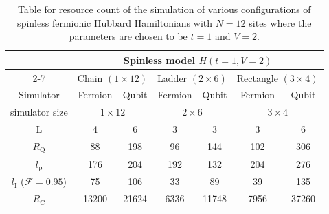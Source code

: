 \documentclass[aps, prx, reprint, superscriptaddress]{revtex4-2}
\begin{document}
\begin{table}[htbp]
\begin{tabular}{|c|cccccc|}
\hline
& \multicolumn{6}{c|}{ Spinless model $H(t{=}1,V{=}2)$}\\
\cline{2-7} 
\multirow{3}{*}{} & 
\multicolumn{2}{c|}{Chain $(1{\times} 12)$} & 
\multicolumn{2}{c|}{Ladder $(2{\times} 6)$} & 
\multicolumn{2}{c|}{Rectangle $(3{\times} 4)$} \\ 

\hline
Simulator & 
\multicolumn{1}{c|}{Fermion} & \multicolumn{1}{c|}{Qubit} & 
\multicolumn{1}{c|}{Fermion} & 
\multicolumn{1}{c|}{Qubit} & 
\multicolumn{1}{c|}{Fermion} & Qubit  \\ 

\hline
simulator size & 
\multicolumn{2}{c|}{$1{\times} 12$} & 
\multicolumn{2}{c|}{$2{\times} 6$} & 
\multicolumn{2}{c|}{$3{\times} 4$}\\ 
\hline
L & 
\multicolumn{1}{c|}{4} & 
\multicolumn{1}{c|}{6} & 
\multicolumn{1}{c|}{3} & 
\multicolumn{1}{c|}{3} & 
\multicolumn{1}{c|}{3} & 6      \\ 

\hline
$R_\text{Q}$ & 
\multicolumn{1}{c|}{88} & 
\multicolumn{1}{c|}{198} & 
\multicolumn{1}{c|}{96} & 
\multicolumn{1}{c|}{144} & 
\multicolumn{1}{c|}{102} & 306   \\ 
\hline

$l_\text{p}$          & 
\multicolumn{1}{c|}{176} & 
\multicolumn{1}{c|}{204} & 
\multicolumn{1}{c|}{192} & 
\multicolumn{1}{c|}{132} & 
\multicolumn{1}{c|}{204} & 276     \\ 

\hline
$l_\text{I}$ ($\mathcal{F}{=}0.95$) & 
\multicolumn{1}{c|}{75}      & 
\multicolumn{1}{c|}{106}   & 
\multicolumn{1}{c|}{33}      & 
\multicolumn{1}{c|}{89}    & 
\multicolumn{1}{c|}{39}      & 135    \\ 
\hline

$R_\text{C}$                     & 
\multicolumn{1}{c|}{13200}   & 
\multicolumn{1}{c|}{21624} & 
\multicolumn{1}{c|}{6336}    & 
\multicolumn{1}{c|}{11748} & 
\multicolumn{1}{c|}{7956}    & 37260 \\ 
\hline

\end{tabular}
\caption{Table for resource count of the simulation of various configurations of spinless fermionic Hubbard Hamiltonians with $N{=}12$ sites where the parameters are chosen to be $t{=}1$ and $V{=}2$.}
\label{table:spinless}
\end{table}
\end{document}
